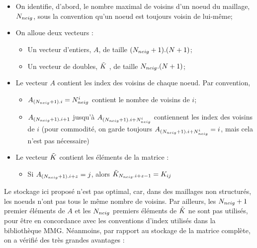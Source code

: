 
\begin{itemize}
	\item On identifie, d'abord, le nombre maximal de voisins d'un noeud du maillage, \(N_{neig}\), sous la convention qu'un noeud est toujours voisin de lui-même;
	\item On alloue deux vecteurs :  
	\begin{itemize}
		\item Un vecteur d'entiers, \(A\), de taille \((N_{neig}+1).(N+1)\);
		\item Un vecteur de doubles, \(\tilde{K}\) , de taille \(N_{neig}.(N+1)\);
	\end{itemize}
	\item Le vecteur \(A\) contient les index des voisins de chaque noeud. Par convention,
	\begin{itemize}
		\item \(A_{(N_{neig}+1).i} = N_{neig}^i\) contient le nombre de voisins de \(i\);
		\item \(A_{(N_{neig}+1).i+1}\) jusqu'à \(A_{(N_{neig}+1).i+N_{neig}^i}\) contiennent les index des voisins de \(i\) (pour commodité, on garde toujours \(A_{(N_{neig}+1).i+N_{neig}^i} = i\), mais cela n'est pas nécessaire)
	\end{itemize}
	\item Le vecteur \(\tilde{K}\) contient les éléments de la matrice : 
	\begin{itemize}
		\item Si \(A_{(N_{neig}+1).i + z} = j\), alors \(\tilde{K}_{N_{neig} . i + z - 1} = K_{ij}\)
	\end{itemize}
\end{itemize}

\indent Le stockage ici proposé n'est pas optimal, car, dans des maillages non structurés, les noeuds n'ont pas tous le même nombre de voisins. Par ailleurs, les \(N_{neig}+1\) premier éléments de \(A\) et les \(N_{neig}\) premiers éléments de \(\tilde{K}\) ne sont pas utilisés, pour être en concordance avec les conventions d'index utilisés dans la bibliothèque MMG. Néanmoins, par rapport au stockage de la matrice complète, on a vérifié des très grandes avantages : 

